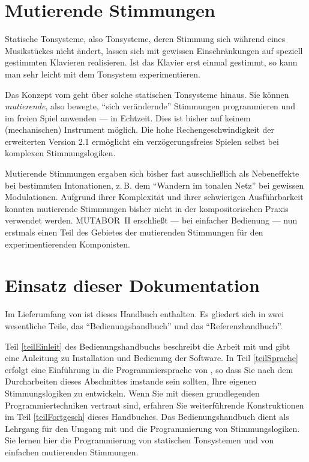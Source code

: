 \section{Mutierende Stimmungen}\label{sec:muti-stimm}

Statische Tonsysteme, also Tonsysteme, deren Stimmung sich
während eines Musikstückes nicht ändert, lassen sich mit gewissen
Einschränkungen auf speziell gestimmten Klavieren realisieren. Ist
das Klavier erst einmal gestimmt, so kann man sehr leicht mit dem
Tonsystem experimentieren.

Das Konzept vom \mutabor{} geht über solche
statischen Tonsysteme hinaus. Sie können {\em mutierende}, also bewegte,
"`sich verändernde"' Stimmungen programmieren und im freien Spiel
anwenden --- in Echtzeit. Dies ist bisher auf keinem (mechanischen)
Instrument möglich. Die hohe Rechengeschwindigkeit der erweiterten
Version 2.1 er\-mög\-licht ein verzögerungsfreies Spielen selbst bei
komplexen Stimmungslogiken.

Mutierende Stimmungen ergaben sich bisher fast ausschließlich als
Nebeneffekte bei bestimmten Intonationen, z.\,B. dem "`Wandern im
tonalen Netz"' bei gewissen Modulationen. Aufgrund ihrer
Komplexität und ihrer schwierigen Ausführbarkeit konnten
mutierende Stimmungen bisher nicht in der kompositorischen Praxis
verwendet werden. MUTABOR~II erschließt --- bei
einfacher Bedienung --- nun erstmals einen Teil des Gebietes der
mutierenden Stimmungen für den experimentierenden Komponisten.

\section{Einsatz dieser Dokumentation}\label{sec:eins-dies-dokum}

Im Lieferumfang von \mutabor{} ist dieses Handbuch
enthalten. Es gliedert sich in zwei wesentliche Teile, das "`Be\-die\-nungs\-hand\-buch"' und das
"`Referenzhandbuch"'.

Teil \ref{teilEinleit} des
Be\-die\-nungs\-hand\-buchs beschreibt die Arbeit
mit \mutabor{} und gibt eine Anleitung zu Installation und Bedienung
der Software. In Teil \ref{teilSprache} erfolgt eine Einführung in die
Programmiersprache von \mutabor{}, so dass Sie nach dem Durcharbeiten
dieses Abschnittes imstande sein sollten, Ihre eigenen
Stimmungslogiken zu entwickeln. Wenn Sie mit diesen grundlegenden
Programmiertechniken ver\-traut sind, erfahren Sie
wei\-ter\-füh\-ren\-de Konstruktionen im Teil \ref{teilFortgesch}
dieses Handbuches.  Das Bedienungs\-hand\-buch dient als Lehrgang für
den Umgang mit \mutabor{} und die Programmierung von Stimmungslogiken.
Sie lernen hier die Programmierung von statischen Tonsystemen und von
einfachen mutierenden Stimmungen.

